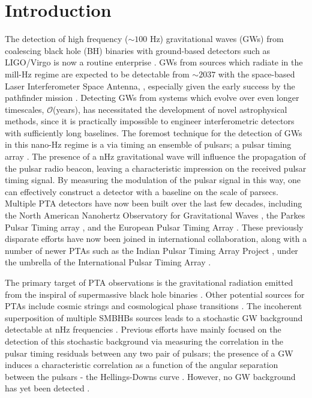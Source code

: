 \documentclass[fleqn,usenatbib,useAMS]{mnras}
\begin{document}
\section{Introduction}
The detection of high frequency ($\sim 100$ Hz) gravitational waves (GWs) from coalescing black hole (BH) binaries with ground-based detectors such as LIGO/Virgo \citep{aLIGO,2015CQGra..32b4001A} is now a routine enterprise \citep[e.g.][]{2019PhRvX...9c1040A,2021PhRvX..11b1053A}. GWs from sources which radiate in the mill-Hz regime are expected to be detectable from $\sim 2037$ with the space-based Laser Interferometer Space Antenna, \citep{LISApaper}, especially given the early success by the pathfinder mission \citep{2019arXiv190308924A}. Detecting GWs from systems which evolve over even longer timescales, $\mathcal{O}$(years), has necessitated the development of novel astrophysical methods, since it is practically impossible to engineer interferometric detectors with sufficiently long baselines. The foremost technique for the detection of GWs in this nano-Hz regime is a via timing an ensemble of pulsars; a pulsar timing array \citep[PTA;][]{2021hgwa.bookE...4V}. The presence  of a nHz gravitational wave will influence the propagation of the pulsar radio beacon, leaving a characteristic impression on the received pulsar timing signal. By measuring the modulation of the pulsar signal in this way, one can effectively construct a detector with a baseline on the scale of parsecs. Multiple PTA detectors have now been built over the last few decades, including the North American Nanohertz Observatory for Gravitational Waves \citep[NANOGrav,][]{2020ApJ...905L..34A}, the Parkes Pulsar Timing array \citep[PPTA][]{2020PASA...37...20K}, and the European Pulsar Timing Array \citep[EPTA,][]{2010CQGra..27h4014F}. These previously disparate efforts have now been joined in international collaboration, along with a number of newer PTAs such as the Indian Pulsar Timing Array Project \citep[InPTA,][]{ipta}, under the umbrella of the International Pulsar Timing Array \citep[IPTA][]{2019MNRAS.490.4666P}. \newline 

The primary target of PTA observations is the gravitational radiation emitted from the inspiral of supermassive black hole binaries \citep[SMBHBs;][]{Rajagopal1995,Wyithe2003,Sesana2013,Ravi2015MNRAS.447.2772R}. Other potential sources for PTAs include cosmic strings \citep[e.g.][]{PTAstring} and cosmological phase transitions \citep[e.g.][]{PTAphase}. The incoherent superposition of multiple SMBHBs sources leads to a stochastic GW background detectable at nHz frequencies \citep{Sesana10}. Previous efforts have mainly focused on the detection of this stochastic background via measuring the correlation in the pulsar timing residuals between any two pair of pulsars; the presence of a GW induces a characteristic correlation as a function of the angular separation between the pulsars - the Hellings-Downs curve \citep{Hellings}. However, no GW background has yet been detected \citep{Lentati2015,NanoGrav2018,2022MNRAS.510.4873A}. \newline 
\end{document}
